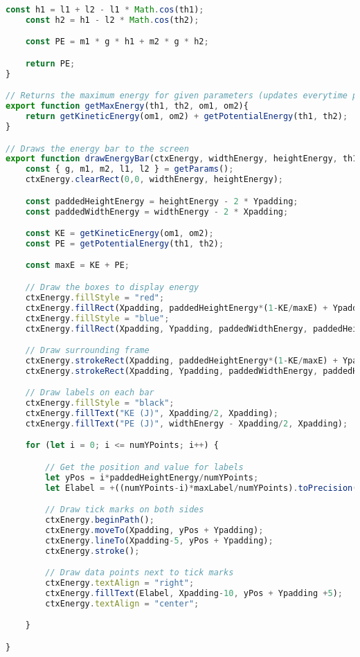 \documentclass[12pt]{article}
\begin{document}
\begin{lstlisting}[language=JavaScript]
    const h1 = l1 + l2 - l1 * Math.cos(th1);
    const h2 = h1 - l2 * Math.cos(th2);

    const PE = m1 * g * h1 + m2 * g * h2;

    return PE;
}

// Returns the maximum energy for given parameters (updates everytime parameters change)
export function getMaxEnergy(th1, th2, om1, om2){
    return getKineticEnergy(om1, om2) + getPotentialEnergy(th1, th2);
}

// Draws the energy bar to the screen
export function drawEnergyBar(ctxEnergy, widthEnergy, heightEnergy, th1, th2, om1, om2, maxLabel){
    const { g, m1, m2, l1, l2 } = getParams();
    ctxEnergy.clearRect(0,0, widthEnergy, heightEnergy);

    const paddedHeightEnergy = heightEnergy - 2 * Ypadding;
    const paddedWidthEnergy = widthEnergy - 2 * Xpadding;

    const KE = getKineticEnergy(om1, om2);
    const PE = getPotentialEnergy(th1, th2);

    const maxE = KE + PE;

    // Draw the boxes to display energy
    ctxEnergy.fillStyle = "red";
    ctxEnergy.fillRect(Xpadding, paddedHeightEnergy*(1-KE/maxE) + Ypadding, paddedWidthEnergy, paddedHeightEnergy*KE/maxE);
    ctxEnergy.fillStyle = "blue";
    ctxEnergy.fillRect(Xpadding, Ypadding, paddedWidthEnergy, paddedHeightEnergy*PE/maxE);

    // Draw surrounding frame
    ctxEnergy.strokeRect(Xpadding, paddedHeightEnergy*(1-KE/maxE) + Ypadding, paddedWidthEnergy, paddedHeightEnergy*KE/maxE)
    ctxEnergy.strokeRect(Xpadding, Ypadding, paddedWidthEnergy, paddedHeightEnergy*PE/maxE);

    // Draw labels on each bar
    ctxEnergy.fillStyle = "black";
    ctxEnergy.fillText("KE (J)", Xpadding/2, Xpadding);
    ctxEnergy.fillText("PE (J)", widthEnergy - Xpadding/2, Xpadding);

    for (let i = 0; i <= numYPoints; i++) {

        // Get the position and value for labels
        let yPos = i*paddedHeightEnergy/numYPoints;
        let Elabel = +((numYPoints-i)*maxLabel/numYPoints).toPrecision(2);

        // Draw tick marks on both sides
        ctxEnergy.beginPath();
        ctxEnergy.moveTo(Xpadding, yPos + Ypadding);
        ctxEnergy.lineTo(Xpadding-5, yPos + Ypadding);
        ctxEnergy.stroke();

        // Draw data points next to tick marks
        ctxEnergy.textAlign = "right";
        ctxEnergy.fillText(Elabel, Xpadding-10, yPos + Ypadding +5);
        ctxEnergy.textAlign = "center";

    }

}

\end{lstlisting}
\end{document}
